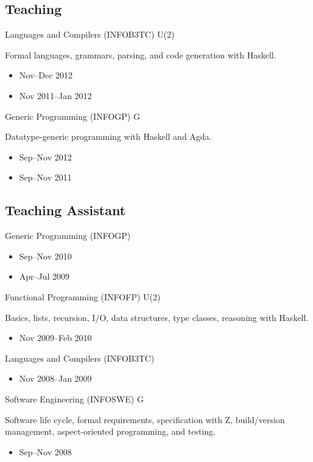\documentclass[11pt,a4paper,roman]{moderncv}
\begin{document}
\subsection{Teaching}

\cvlistitem{\coursenote}

\cventry%
{}%
{Languages and Compilers (INFOB3TC)}%
{\uu}%
{}%
{U(2)}%
{Formal languages, grammars, parsing, and code generation with Haskell.
\begin{itemize}
\item Nov--Dec 2012
\item Nov 2011--Jan 2012
\end{itemize}}

\cventry%
{}%
{Generic Programming (INFOGP)}%
{\uu}%
{}%
{G}%
{Datatype-generic programming with Haskell and Agda.
\begin{itemize}
\item Sep--Nov 2012
\item Sep--Nov 2011
\end{itemize}}


\subsection{Teaching Assistant}

\cvlistitem{\coursenote}

\cventry%
{}%
{Generic Programming (INFOGP)}%
{\uu}%
{}%
{}%
{\begin{itemize}
\item Sep--Nov 2010
\item Apr--Jul 2009
\end{itemize}}

\cventry%
{}%
{Functional Programming (INFOFP)}%
{\uu}%
{}%
{U(2)}%
{Basics, lists, recursion, I/O, data structures, type classes, reasoning with Haskell.
\begin{itemize}
\item Nov 2009--Feb 2010
\end{itemize}}

\cventry%
{}%
{Languages and Compilers (INFOB3TC)}%
{\uu}%
{}%
{}%
{\begin{itemize}
\item Nov 2008--Jan 2009
\end{itemize}}

\cventry%
{}%
{Software Engineering (INFOSWE)}%
{\uu}%
{}%
{G}%
{Software life cycle, formal requirements, specification with Z, build/version management, aspect-oriented programming, and testing.
\begin{itemize}
\item Sep--Nov 2008
\end{itemize}}
\end{document}
